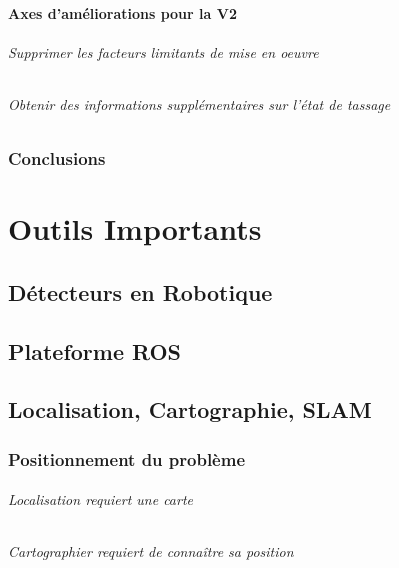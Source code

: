 \documentclass[12pt,a4paper]{report}
\begin{document}
\subsection{Axes d'améliorations pour la V2}

\paragraph{Supprimer les facteurs limitants de mise en oeuvre}

\paragraph{Obtenir des informations supplémentaires sur l'état de tassage}

\section{Conclusions}






\part{Outils Importants }

\chapter{Détecteurs en Robotique}

\chapter{Plateforme ROS}

\chapter{Localisation, Cartographie, SLAM}
\section{Positionnement du problème}

\paragraph{Localisation requiert une carte}

\paragraph{Cartographier requiert de connaître sa position}
\end{document}
